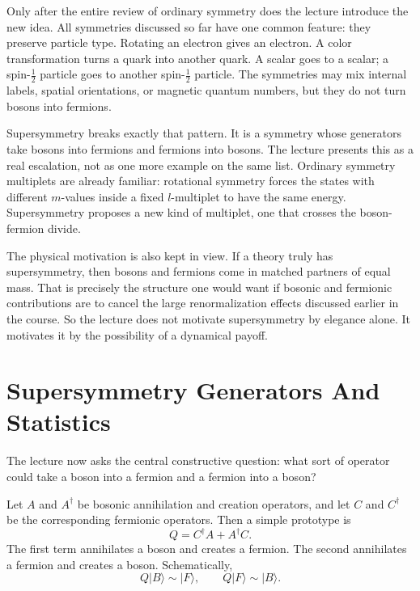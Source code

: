 Only after the entire review of ordinary symmetry does the lecture introduce the new idea. All symmetries discussed so far have one common feature: they preserve particle type. Rotating an electron gives an electron. A color transformation turns a quark into another quark. A scalar goes to a scalar; a spin-\(\tfrac12\) particle goes to another spin-\(\tfrac12\) particle. The symmetries may mix internal labels, spatial orientations, or magnetic quantum numbers, but they do not turn bosons into fermions.

Supersymmetry breaks exactly that pattern. It is a symmetry whose generators take bosons into fermions and fermions into bosons. The lecture presents this as a real escalation, not as one more example on the same list. Ordinary symmetry multiplets are already familiar: rotational symmetry forces the states with different \(m\)-values inside a fixed \(l\)-multiplet to have the same energy. Supersymmetry proposes a new kind of multiplet, one that crosses the boson-fermion divide.

The physical motivation is also kept in view. If a theory truly has supersymmetry, then bosons and fermions come in matched partners of equal mass. That is precisely the structure one would want if bosonic and fermionic contributions are to cancel the large renormalization effects discussed earlier in the course. So the lecture does not motivate supersymmetry by elegance alone. It motivates it by the possibility of a dynamical payoff.

\section{Supersymmetry Generators And Statistics}

The lecture now asks the central constructive question: what sort of operator could take a boson into a fermion and a fermion into a boson?

Let \(A\) and \(A^\dagger\) be bosonic annihilation and creation operators, and let \(C\) and \(C^\dagger\) be the corresponding fermionic operators. Then a simple prototype is
\begin{equation}
Q = C^\dagger A + A^\dagger C.
\end{equation}
The first term annihilates a boson and creates a fermion. The second annihilates a fermion and creates a boson. Schematically,
\begin{equation}
Q|B\rangle \sim |F\rangle,
\qquad
Q|F\rangle \sim |B\rangle.
\end{equation}

